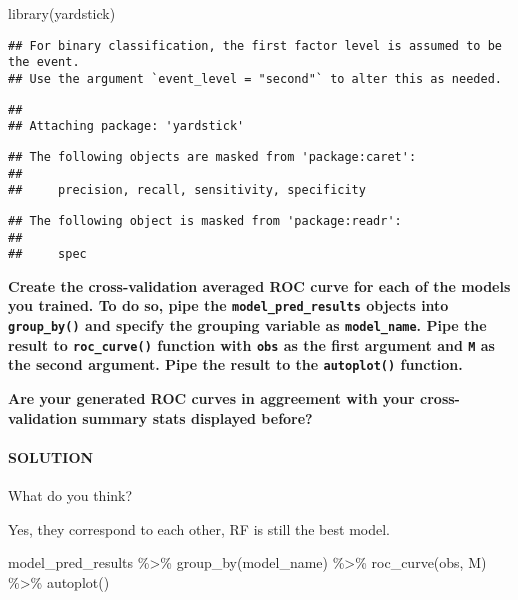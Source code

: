 \documentclass[
]{article}
\newenvironment{Shaded}{\begin{snugshade}}{\end{snugshade}}
\newcommand{\FunctionTok}[1]{\textcolor[rgb]{0.00,0.00,0.00}{#1}}
\newcommand{\NormalTok}[1]{#1}
\newcommand{\SpecialCharTok}[1]{\textcolor[rgb]{0.00,0.00,0.00}{#1}}
\begin{document}
\begin{Shaded}
\begin{Highlighting}[]
\FunctionTok{library}\NormalTok{(yardstick)}
\end{Highlighting}
\end{Shaded}

\begin{verbatim}
## For binary classification, the first factor level is assumed to be the event.
## Use the argument `event_level = "second"` to alter this as needed.
\end{verbatim}

\begin{verbatim}
## 
## Attaching package: 'yardstick'
\end{verbatim}

\begin{verbatim}
## The following objects are masked from 'package:caret':
## 
##     precision, recall, sensitivity, specificity
\end{verbatim}

\begin{verbatim}
## The following object is masked from 'package:readr':
## 
##     spec
\end{verbatim}

\textbf{Create the cross-validation averaged ROC curve for each of the
models you trained. To do so, pipe the \texttt{model\_pred\_results}
objects into \texttt{group\_by()} and specify the grouping variable as
\texttt{model\_name}. Pipe the result to \texttt{roc\_curve()} function
with \texttt{obs} as the first argument and \texttt{M} as the second
argument. Pipe the result to the \texttt{autoplot()} function.}

\textbf{Are your generated ROC curves in aggreement with your
cross-validation summary stats displayed before?}

\hypertarget{solution-24}{%
\paragraph{SOLUTION}\label{solution-24}}

What do you think?

Yes, they correspond to each other, RF is still the best model.

\begin{Shaded}
\begin{Highlighting}[]
\NormalTok{model\_pred\_results }\SpecialCharTok{\%\textgreater{}\%}
  \FunctionTok{group\_by}\NormalTok{(model\_name) }\SpecialCharTok{\%\textgreater{}\%}
  \FunctionTok{roc\_curve}\NormalTok{(obs, M) }\SpecialCharTok{\%\textgreater{}\%}
  \FunctionTok{autoplot}\NormalTok{()}
\end{Highlighting}
\end{Shaded}
\end{document}
